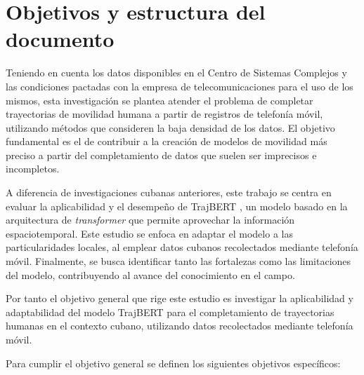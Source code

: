 
\section*{Objetivos y estructura del documento}

Teniendo en cuenta los datos disponibles en el Centro de Sistemas Complejos y las condiciones pactadas con la empresa de telecomunicaciones para el uso de los mismos, esta investigación se plantea atender el problema de completar trayectorias de movilidad humana a partir de registros de telefonía móvil, utilizando métodos que consideren la baja densidad de los datos. El objetivo fundamental es el de contribuir a la creación de modelos de movilidad más preciso a partir del completamiento de datos que suelen ser imprecisos e incompletos.

A diferencia de investigaciones cubanas anteriores, este trabajo se centra en evaluar la aplicabilidad y el desempeño de TrajBERT \cite{si2023trajbert}, un modelo basado en la arquitectura de \textit{transformer} \cite{vaswani2017attention} que permite aprovechar la información espaciotemporal. Este estudio se enfoca en adaptar el modelo a las particularidades locales, al emplear datos cubanos recolectados mediante telefonía móvil. Finalmente, se busca identificar tanto las fortalezas como las limitaciones del modelo, contribuyendo al avance del conocimiento en el campo.

Por tanto el objetivo general que rige este estudio es investigar la aplicabilidad y adaptabilidad del modelo TrajBERT para el completamiento de trayectorias humanas en el contexto cubano, utilizando datos recolectados mediante telefonía móvil.

Para cumplir el objetivo general se definen los siguientes objetivos específicos:

